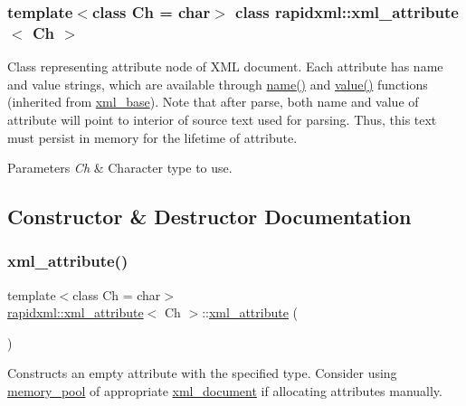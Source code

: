 \subsubsection*{template$<$class Ch = char$>$\newline
class rapidxml\+::xml\+\_\+attribute$<$ Ch $>$}

Class representing attribute node of X\+ML document. Each attribute has name and value strings, which are available through \hyperlink{classrapidxml_1_1xml__base_aef8ae147fbee59209f714274afc80dc4}{name()} and \hyperlink{classrapidxml_1_1xml__base_a6af65de5e59ac497cd69838f8a89d602}{value()} functions (inherited from \hyperlink{classrapidxml_1_1xml__base}{xml\+\_\+base}). Note that after parse, both name and value of attribute will point to interior of source text used for parsing. Thus, this text must persist in memory for the lifetime of attribute. 
\begin{DoxyParams}{Parameters}
{\em Ch} & Character type to use. \\
\hline
\end{DoxyParams}


\subsection{Constructor \& Destructor Documentation}
\mbox{\label{classrapidxml_1_1xml__attribute_a26be291103917d3e8de110d46dd83816}} 
\subsubsection{\texorpdfstring{xml\+\_\+attribute()}{xml\_attribute()}}
{\footnotesize\ttfamily template$<$class Ch = char$>$ \\
\hyperlink{classrapidxml_1_1xml__attribute}{rapidxml\+::xml\+\_\+attribute}$<$ Ch $>$\+::\hyperlink{classrapidxml_1_1xml__attribute}{xml\+\_\+attribute} (\begin{DoxyParamCaption}{ }\end{DoxyParamCaption})\hspace{0.3cm}{\ttfamily [inline]}}

Constructs an empty attribute with the specified type. Consider using \hyperlink{classrapidxml_1_1memory__pool}{memory\+\_\+pool} of appropriate \hyperlink{classrapidxml_1_1xml__document}{xml\+\_\+document} if allocating attributes manually. 

